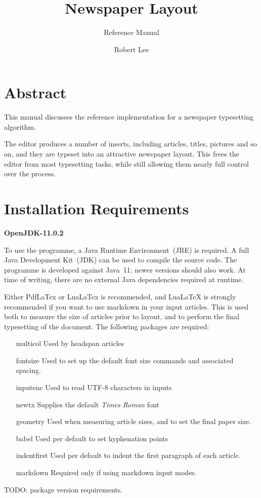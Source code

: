 \documentclass[a4paper,DIV=11]{scrartcl}
\author{Robert Lee}
\title{Newspaper Layout}
\subtitle{Reference Manual}
\newcommand{\deft}[2]{\nopagebreak\noindent\hspace{0.5in}\textbf{#1}\par\noindent{}#2\pagebreak[1]\par}
\begin{document}
\maketitle

\setlength{\parskip}{0.5ex plus 0.5ex}


\section{Abstract}

This manual discusses the reference implementation for a newspaper
typesetting algorithm.

The editor produces a number of inserts, including articles, titles,
pictures and so on, and they are typeset into an attractive newspaper
layout. This frees the editor from most typesetting tasks, while still
allowing them nearly full control over the process.


\section{Installation Requirements}

\deft{OpenJDK-11.0.2}{To use the programme, a Java Runtime
  Environment~(JRE) is required. A full Java Development Kit~(JDK) can
  be used to compile the source code. The programme is developed
  against Java~11; newer versions should also work. At time of
  writing, there are no external Java dependencies required at
  runtime.}

\deft{\LaTeXe}{Either PdfLaTex or LuaLaTex is recommended, and
  LuaLaTeX is strongly recommended if you want to use markdown in your
  input articles. This is used both to measure the size of articles
  prior to layout, and to perform the final typesetting of the document.
  The following packages are required:
  \begin{itemize}
  \item[multicol] Used by headspan articles
  \item[fontsize] Used to set up the default font size commands and associated spacing.
  \item[inputenc] Used to read UTF-8 characters in inputs
  \item[newtx] Supplies the default \textit{Times Roman} font
  \item[geometry] Used when measuring article sizes, and to set the
    final paper size.
  \item[babel] Used per default to set hyphenation points
  \item[indentfirst] Used per default to indent the first paragraph of
    each article.
  \item[markdown] Required only if using markdown input modes.
  \end{itemize}
  TODO:
  package version requirements.}
\end{document}
